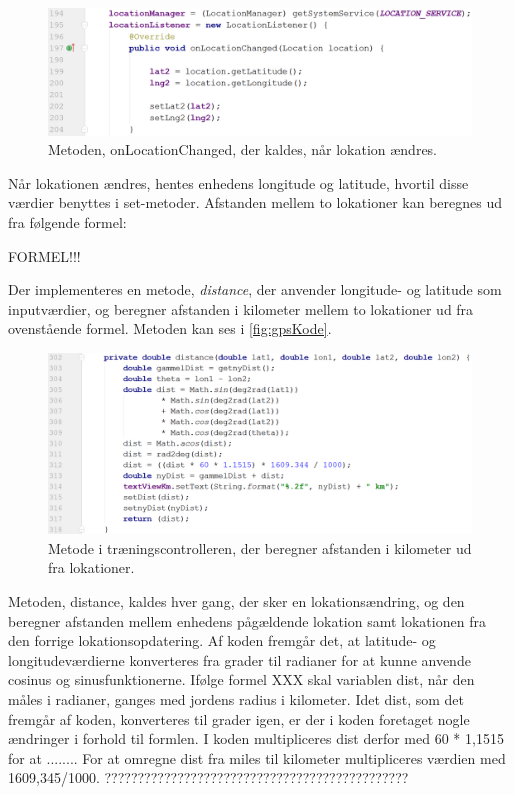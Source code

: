 \begin{figure} [H]
\centering
\includegraphics[width=1\textwidth]{figures/imple/gpsKode}
\caption{Metoden, onLocationChanged, der kaldes, når lokation ændres.}
\label{fig:gpsKode}
\end{figure} 

Når lokationen ændres, hentes enhedens longitude og latitude, hvortil disse værdier benyttes i set-metoder. Afstanden mellem to lokationer kan beregnes ud fra følgende formel:


FORMEL!!!

Der implementeres en metode, \textit{distance}, der anvender longitude- og latitude som inputværdier, og beregner afstanden i kilometer mellem to lokationer ud fra ovenstående formel. Metoden kan ses i \autoref{fig:gpsKode}.

\begin{figure} [H]
\centering
\includegraphics[width=1\textwidth]{figures/imple/distanceKode}
\caption{Metode i træningscontrolleren, der beregner afstanden i kilometer ud fra lokationer.}
\label{fig:disanceKode}
\end{figure} 

Metoden, distance, kaldes hver gang, der sker en lokationsændring, og den beregner afstanden mellem enhedens pågældende lokation samt lokationen fra den forrige lokationsopdatering. Af koden fremgår det, at latitude- og longitudeværdierne konverteres fra grader til radianer for at kunne anvende cosinus og sinusfunktionerne. Ifølge formel XXX skal variablen dist, når den måles i radianer, ganges med jordens radius i kilometer. Idet dist, som det fremgår af koden, konverteres til grader igen, er der i koden foretaget nogle ændringer i forhold til formlen. I koden multipliceres dist derfor med 60 * 1,1515 for at ........ For at omregne dist fra miles til kilometer multipliceres værdien med 1609,345/1000. ??????????????????????????????????????????????

